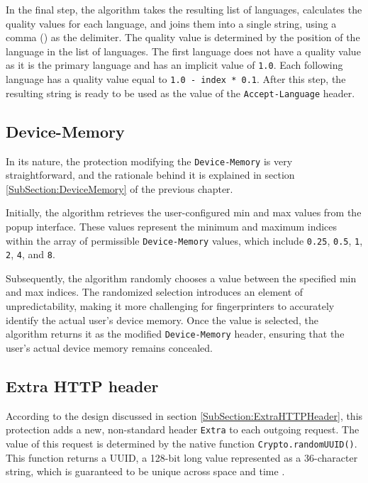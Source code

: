 In the final step, the algorithm takes the resulting list of languages, calculates the quality values for each language, and joins them into a single string, using a comma (\uv{,}) as the delimiter. The quality value is determined by the position of the language in the list of languages. The first language does not have a quality value as it is the primary language and has an implicit value of \texttt{1.0}. Each following language has a quality value equal to \texttt{1.0 - index * 0.1}. After this step, the resulting string is ready to be used as the value of the \texttt{Accept-Language} header.

\subsection{Device-Memory}

In its nature, the protection modifying the \texttt{Device-Memory} is very straightforward, and the rationale behind it is explained in section \ref{SubSection:DeviceMemory} of the previous chapter.

Initially, the algorithm retrieves the user-configured min and max values from the popup interface. These values represent the minimum and maximum indices within the array of permissible \texttt{Device-Memory} values, which include \texttt{0.25}, \texttt{0.5}, \texttt{1}, \texttt{2}, \texttt{4}, and \texttt{8}.

Subsequently, the algorithm randomly chooses a value between the specified min and max indices. The randomized selection introduces an element of unpredictability, making it more challenging for fingerprinters to accurately identify the actual user's device memory. Once the value is selected, the algorithm returns it as the modified \texttt{Device-Memory} header, ensuring that the user's actual device memory remains concealed.


\subsection{Extra HTTP header}

According to the design discussed in section \ref{SubSection:ExtraHTTPHeader}, this protection adds a new, non-standard header \texttt{Extra} to each outgoing request. The value of this request is determined by the native function \texttt{Crypto.randomUUID()}. This function returns a UUID, a 128-bit long value represented as a 36-character string, which is guaranteed to be unique across space and time \cite{RFC4122}.

